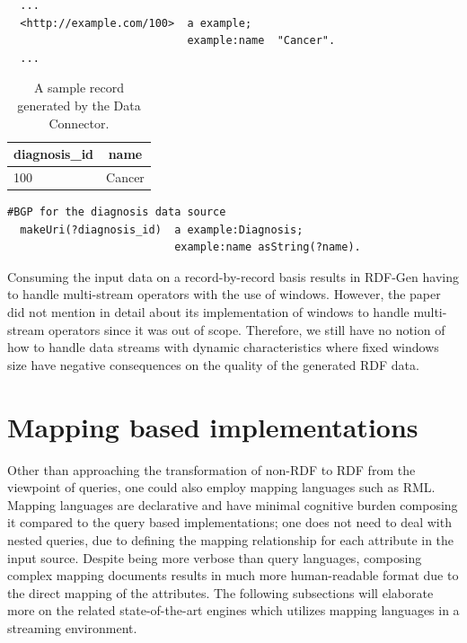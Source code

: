 \begin{lstlisting}
  ... 
  <http://example.com/100>  a example; 
                            example:name  "Cancer". 
  ...
\end{lstlisting}


\begin{table}[!htbp]
  \centering
  \begin{tabular}{l|l}
  \multicolumn{1}{c|}{\textbf{diagnosis\_id}} & \multicolumn{1}{c}{\textbf{name}} \\ \hline
  100                                 & Cancer                    
  \end{tabular}
  \caption{A sample record generated by the Data Connector.}
  \label{tab:rdf_gen_sample_record}
  \end{table}

\begin{lstlisting}[language={SPARQL},
   caption={A simple graph template $G$ with the functions \emph{asString} and \emph{makeUri}.}, 
   label={lst:rdf_gen_example}
  ]
  #BGP for the diagnosis data source
  makeUri(?diagnosis_id)  a example:Diagnosis;
                          example:name asString(?name).
\end{lstlisting}

Consuming the input data on a record-by-record basis results in RDF-Gen having to 
handle multi-stream operators with the use of windows. However, the paper did not 
mention in detail about its implementation of windows to handle 
multi-stream operators since it was out of scope. Therefore, we still have no 
notion of how to handle data streams with dynamic characteristics where fixed windows 
size have negative consequences on the quality of the generated RDF data. 


\section{Mapping based implementations}
\label{sec:mapping_based_implementation}
Other than approaching the transformation of non-RDF to RDF from the viewpoint of 
queries, one could also employ mapping languages such as RML. Mapping languages 
are declarative and have minimal cognitive burden composing it compared to the
query based implementations; one does not need to deal with nested queries,
due to defining the mapping relationship for each attribute in 
the input source. Despite being more 
verbose than query languages, composing complex mapping documents results in much more human-readable 
format due to the direct mapping of the attributes. 
The following subsections will elaborate more on the related state-of-the-art engines 
which utilizes mapping languages in a streaming environment.


